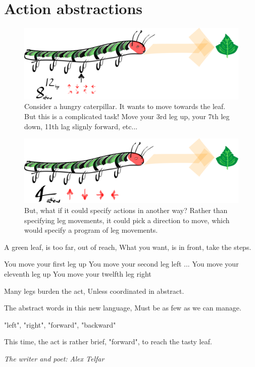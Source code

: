 \section{Action abstractions}

\begin{figure}
\centering
\includegraphics[width=\textwidth,height=0.25\textheight]{../../pictures/drawings/hungry-caterpillar.png}
\caption{Consider a hungry caterpillar. It wants to move towards the leaf. But this is a complicated task! Move your 3rd leg up, your 7th leg down, 11th lag slignly forward, etc...}
\end{figure}


\begin{figure}
\centering
\includegraphics[width=\textwidth,height=0.25\textheight]{../../pictures/drawings/full-caterpillar.png}
\caption{But, what if it could specify actions in another way? Rather than specifying leg movements, it could pick a direction to move, which would specify a program of leg movements.}
\end{figure}

\epigraph{
A green leaf, is too far, out of reach,
What you want, is in front, take the steps.

You move your first leg up You move your second leg left ... You move your eleventh leg up You move your twelfth leg right

Many legs burden the act,
Unless coordinated in abstract.

The abstract words in this new language,
Must be as few as we can manage.

"left", "right", "forward", "backward"

This time, the act is rather brief,
"forward", to reach the tasty leaf.
}{\textit{The writer and poet: Alex Telfar}}


